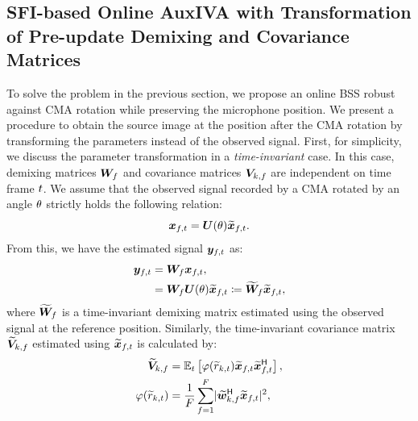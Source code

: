 \documentclass[sip,biber]{now-journal}
\begin{document}
\subsection{SFI-based Online AuxIVA with Transformation of Pre-update Demixing and Covariance Matrices}

To solve the problem in the previous section, we propose an online BSS robust against CMA rotation while preserving the microphone position.
We present a procedure to obtain the source image at the position after the CMA rotation by transforming the parameters instead of the observed signal.
First, for simplicity, we discuss the parameter transformation in a \emph{time-invariant} case.
In this case, demixing matrices $\bm{W} _{f}$ and covariance matrices $\bm{V} _{k,f}$ are independent on time frame $t$.
We assume that the observed signal recorded by a CMA rotated by an angle $\theta$ strictly holds the following relation:
\begin{equation}
  \Obs _{\ft} = \rotMat (\rotSpat) \refpos{\Obs} _{\ft}.
\end{equation}
From this, we have the estimated signal $\Est _{\ft}$ as:
\begin{align}
  \Est _{\ft} &= \Demix _{\freq} \Obs _{\ft}, \\
              &= \Demix _{\freq} \rotMat (\rotSpat) \refpos{\Obs} _{\ft} \coloneqq \refpos{\Demix} _{\freq} \refpos{\Obs} _{\ft}, \label{eq:rt:demix:batch}
\end{align}
where $\widetilde{\bm{W}} _{f}$ is a time-invariant demixing matrix estimated using the observed signal at the reference position.
Similarly, the time-invariant covariance matrix $\widetilde{\bm{V}} _{k,f}$ estimated using $\refpos{\Obs} _{\ft}$ is calculated by:
\begin{align}
  \refpos{\cov} _{\src,\freq} &= \expct  _{\tframe} \left[\weight (\refpos{\var} _{\src,\tframe}) \refpos{\Obs} _{\ft} \refpos{\Obs} _{\ft} ^{\hermite}\right], \\
  \weight (\refpos{\var} _{\src,\tframe}) &= \frac{1}{\Freq} \sum _{\freq = 1} ^{\Freq} \lvert \refpos{\demix} _{\src,\freq} ^{\hermite} \refpos{\Obs} _{\ft} \rvert ^2,
\end{align}
\end{document}
